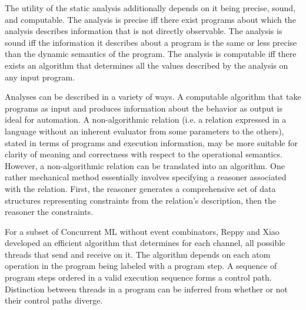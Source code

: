 \documentclass[10pt]{article}
\begin{document}
The utility of the static analysis additionally depends on it being precise, sound, and
computable. The analysis is precise iff there exist programs about which the analysis
describes information that is not directly observable. The analysis is sound iff the
information it describes about a program is the same or less precise than the dynamic
semantics of the program. The analysis is computable iff there exists an algorithm that
determines all the values described by the analysis on any input program.

Analyses can be described in a variety of ways. A computable algorithm that take programs
as input and produces information about the behavior as output is ideal for automation. A
non-algorithmic relation (i.e. a relation expressed in a language without an inherent evaluator
from some parameters to the others),
stated in terms of programs and execution information, may be
more suitable for clarity of meaning and correctness with respect to the operational
semantics. However, a non-algorithmic relation can be translated into an algorithm.
One rather mechanical method essentially involves
specifying a reasoner associated with the relation. 
First, the reasoner generates a comprehensive set of data structures representing
constraints from the relation's description, then the reasoner the constraints.

For a subset of Concurrent ML without event combinators, Reppy and Xiao developed an
efficient algorithm that determines for each channel, all possible threads that send
and receive on it. The algorithm depends on each atom operation in the program being
labeled with a program step. A sequence of program steps ordered in a valid execution
sequence forms a control path. Distinction between threads in a program can be inferred from
whether or not their control paths diverge.  
\end{document}
